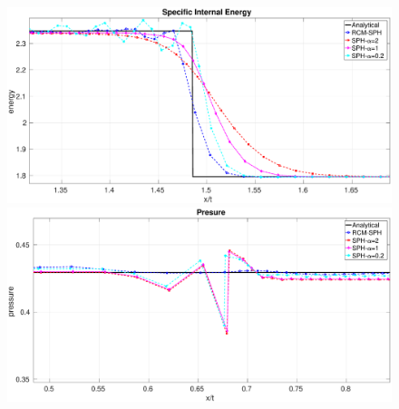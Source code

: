 \begin{figure}[htp]
\begin{minipage}{.495 \textwidth}
    \end{minipage}%
    \\
    \begin{minipage}{.495 \textwidth}
        \centering
        \includegraphics[width=0.99 \textwidth]{Chapter-4/Figures/Sod/RCM-Sod-SPH-alf-e-zoom}
    \end{minipage}%
    \begin{minipage}{.495\textwidth}
        \centering
        \includegraphics[width=0.99 \textwidth]{Chapter-4/Figures/Sod/RCM-Sod-SPH-alf-p-zoom}
    \end{minipage}%

\end{figure}

